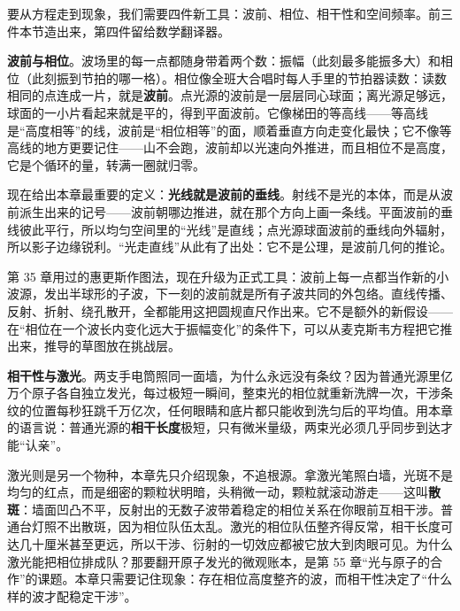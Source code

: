 
要从方程走到现象，我们需要四件新工具：波前、相位、相干性和空间频率。前三件本节造出来，第四件留给数学翻译器。

\textbf{波前与相位}。波场里的每一点都随身带着两个数：振幅（此刻最多能振多大）和相位（此刻振到节拍的哪一格）。相位像全班大合唱时每人手里的节拍器读数：读数相同的点连成一片，就是\textbf{波前}。点光源的波前是一层层同心球面；离光源足够远，球面的一小片看起来就是平的，得到平面波前。它像梯田的等高线——等高线是“高度相等”的线，波前是“相位相等”的面，顺着垂直方向走变化最快；它不像等高线的地方更要记住——山不会跑，波前却以光速向外推进，而且相位不是高度，它是个循环的量，转满一圈就归零。

现在给出本章最重要的定义：\textbf{光线就是波前的垂线}。射线不是光的本体，而是从波前派生出来的记号——波前朝哪边推进，就在那个方向上画一条线。平面波前的垂线彼此平行，所以均匀空间里的“光线”是直线；点光源球面波前的垂线向外辐射，所以影子边缘锐利。“光走直线”从此有了出处：它不是公理，是波前几何的推论。

\begin{center}
\end{center}

第 35 章用过的惠更斯作图法，现在升级为正式工具：波前上每一点都当作新的小波源，发出半球形的子波，下一刻的波前就是所有子波共同的外包络。直线传播、反射、折射、绕孔散开，全都能用这把圆规直尺作出来。它不是额外的新假设——在“相位在一个波长内变化远大于振幅变化”的条件下，可以从麦克斯韦方程把它推出来，推导的草图放在挑战层。

\textbf{相干性与激光}。两支手电筒照同一面墙，为什么永远没有条纹？因为普通光源里亿万个原子各自独立发光，每过极短一瞬间，整束光的相位就重新洗牌一次，干涉条纹的位置每秒狂跳千万亿次，任何眼睛和底片都只能收到洗匀后的平均值。用本章的语言说：普通光源的\textbf{相干长度}极短，只有微米量级，两束光必须几乎同步到达才能“认亲”。

激光则是另一个物种，本章先只介绍现象，不追根源。拿激光笔照白墙，光斑不是均匀的红点，而是细密的颗粒状明暗，头稍微一动，颗粒就滚动游走——这叫\textbf{散斑}：墙面凹凸不平，反射出的无数子波带着稳定的相位关系在你眼前互相干涉。普通台灯照不出散斑，因为相位队伍太乱。激光的相位队伍整齐得反常，相干长度可达几十厘米甚至更远，所以干涉、衍射的一切效应都被它放大到肉眼可见。为什么激光能把相位排成队？那要翻开原子发光的微观账本，是第 55 章“光与原子的合作”的课题。本章只需要记住现象：存在相位高度整齐的波，而相干性决定了“什么样的波才配稳定干涉”。

